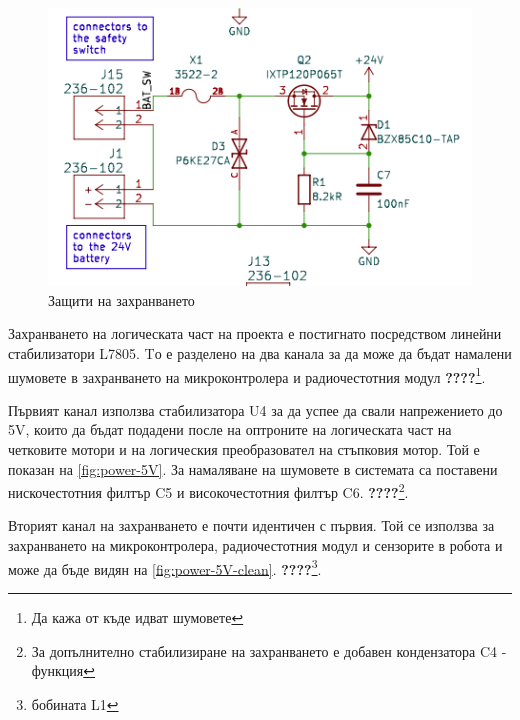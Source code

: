 \begin{figure}[H]
    \centering
    \includegraphics[width=0.6\linewidth]{images/power-protection.png}
    
    \caption{Защити на захранването}
    \label{fig:power-protection} 
\end{figure}

Захранването на логическата част на проекта е постигнато посредством линейни стабилизатори L7805. Tо е разделено на два канала за да може да бъдат намалени шумовете в захранването на микроконтролера и радиочестотния модул \textbf{????}\footnote{Да кажа от къде идват шумовете}. 

Първият канал използва стабилизатора U4 за да успее да свали напрежението до 5V, които да бъдат подадени после на оптроните на логическата част на четковите мотори и на логическия преобразовател на стъпковия мотор. Той е показан на \cref{fig:power-5V}. За намаляване на шумовете в системата са поставени нискочестотния филтър C5 и високочестотния филтър C6. \textbf{????}\footnote{За допълнително стабилизиране на захранването е добавен кондензатора C4 - функция}. 

Вторият канал на захранването е почти идентичен с първия. Той се използва за захранването на микроконтролера, радиочестотния модул и сензорите в робота и може да бъде видян на \cref{fig:power-5V-clean}. \textbf{????}\footnote{бобината L1}.

